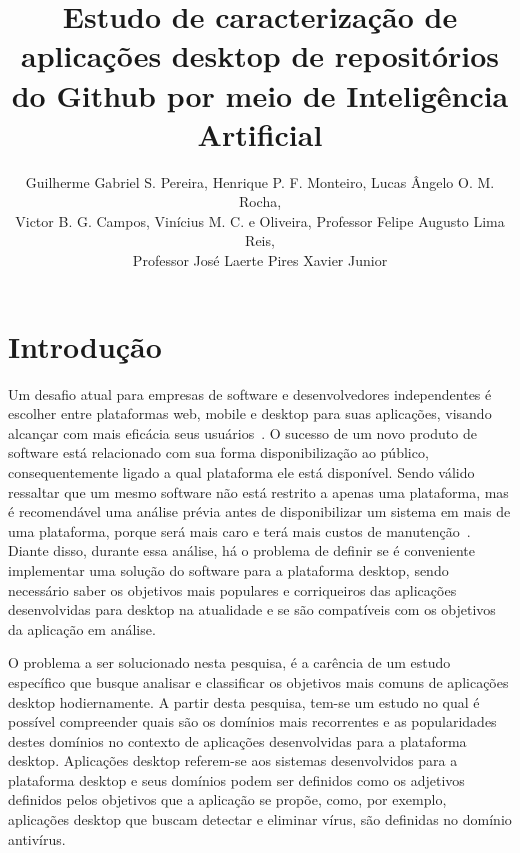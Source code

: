 \documentclass[12pt]{article}
\title{Estudo de caracterização de aplicações desktop de repositórios do Github por meio de Inteligência Artificial}
\author{Guilherme Gabriel S. Pereira, Henrique P. F. Monteiro, Lucas Ângelo O. M. Rocha, 
\\ Victor B. G. Campos, Vinícius M. C. e Oliveira, Professor Felipe Augusto Lima Reis, 
\\ Professor José Laerte Pires Xavier Junior }
\begin{document}
 

\maketitle 

\begin{abstract}
  
\end{abstract}
     
\begin{resumo} 
  
\end{resumo}


\section{Introdução} \label{introducao}

Um desafio atual para empresas de software e desenvolvedores independentes é escolher entre plataformas web, mobile e desktop para suas aplicações, visando alcançar com mais eficácia seus usuários~\cite{9463138}. O sucesso de um novo produto de software está relacionado com sua forma disponibilização ao público, consequentemente ligado a qual plataforma ele está disponível. Sendo válido ressaltar que um mesmo software não está restrito a apenas uma plataforma, mas é recomendável uma análise prévia antes de disponibilizar um sistema em mais de uma plataforma, porque será mais caro e terá mais custos de manutenção~\cite{Eke2019}. Diante disso, durante essa análise, há o problema de definir se é conveniente implementar uma solução do software para a plataforma desktop, sendo necessário saber os objetivos mais populares e corriqueiros das aplicações desenvolvidas para desktop na atualidade e se são compatíveis com os objetivos da aplicação em análise.

O problema a ser solucionado nesta pesquisa, é a carência de um estudo específico que busque analisar e classificar os objetivos mais comuns de aplicações desktop hodiernamente. A partir desta pesquisa, tem-se um estudo no qual é possível compreender quais são os domínios mais recorrentes e as popularidades destes domínios no contexto de aplicações desenvolvidas para a plataforma desktop. Aplicações desktop referem-se aos sistemas desenvolvidos para a plataforma desktop e seus domínios podem ser definidos como os adjetivos definidos pelos objetivos que a aplicação se propõe, como, por exemplo, aplicações desktop que buscam detectar e eliminar vírus, são definidas no domínio antivírus.
\end{document}
